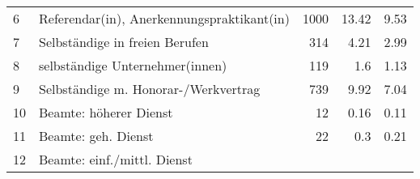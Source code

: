 \begin{longtable}{lXrrr}
     6 &
     \multicolumn{1}{X}{ Referendar(in), Anerkennungspraktikant(in)   } &


       \num{1000} &
       \num[round-mode=places,round-precision=2]{13.42} &
         \num[round-mode=places,round-precision=2]{9.53} \\

     7 &
     \multicolumn{1}{X}{ Selbständige in freien Berufen   } &


       \num{314} &
       \num[round-mode=places,round-precision=2]{4.21} &
         \num[round-mode=places,round-precision=2]{2.99} \\

     8 &
     \multicolumn{1}{X}{ selbständige Unternehmer(innen)   } &


       \num{119} &
       \num[round-mode=places,round-precision=2]{1.6} &
         \num[round-mode=places,round-precision=2]{1.13} \\

     9 &
     \multicolumn{1}{X}{ Selbständige m. Honorar-/Werkvertrag   } &


       \num{739} &
       \num[round-mode=places,round-precision=2]{9.92} &
         \num[round-mode=places,round-precision=2]{7.04} \\

     10 &
     \multicolumn{1}{X}{ Beamte: höherer Dienst   } &


       \num{12} &
       \num[round-mode=places,round-precision=2]{0.16} &
         \num[round-mode=places,round-precision=2]{0.11} \\

     11 &
     \multicolumn{1}{X}{ Beamte: geh. Dienst   } &


       \num{22} &
       \num[round-mode=places,round-precision=2]{0.3} &
         \num[round-mode=places,round-precision=2]{0.21} \\

     12 &
     \multicolumn{1}{X}{ Beamte: einf./mittl. Dienst   } &



\end{longtable}

